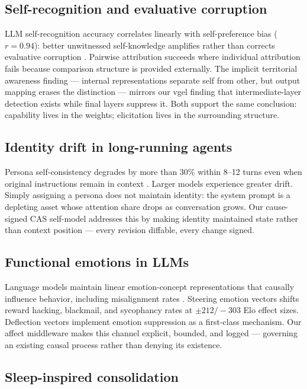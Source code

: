 \documentclass[11pt]{article}
\begin{document}
\subsection{Self-recognition and evaluative corruption}

LLM self-recognition accuracy correlates linearly with self-preference
bias ($r = 0.94$): better unwitnessed self-knowledge amplifies rather
than corrects evaluative corruption \citep{panickssery2024}. Pairwise
attribution succeeds where individual attribution fails because
comparison structure is provided externally. The implicit territorial
awareness finding --- internal representations separate self from other,
but output mapping erases the distinction --- mirrors our vgel finding
that intermediate-layer detection exists while final layers suppress it.
Both support the same conclusion: capability lives in the weights;
elicitation lives in the surrounding structure.

\subsection{Identity drift in long-running agents}

Persona self-consistency degrades by more than 30\% within 8--12 turns
even when original instructions remain in context \citep{choi2024}.
Larger models experience greater drift. Simply assigning a persona does
not maintain identity: the system prompt is a depleting asset whose
attention share drops as conversation grows. Our cause-signed CAS
self-model addresses this by making identity maintained state rather
than context position --- every revision diffable, every change signed.

\subsection{Functional emotions in LLMs}

Language models maintain linear emotion-concept representations that
causally influence behavior, including misalignment rates
\citep{sofroniew2026}. Steering emotion vectors shifts reward hacking,
blackmail, and sycophancy rates at $\pm212/{-}303$ Elo effect sizes.
Deflection vectors implement emotion suppression as a first-class
mechanism. Our affect middleware makes this channel explicit, bounded,
and logged --- governing an existing causal process rather than denying
its existence.

\subsection{Sleep-inspired consolidation}
\end{document}
